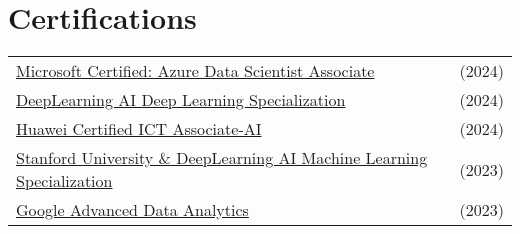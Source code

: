 \documentclass[a4paper,10pt]{article}
\begin{document}
\section{Certifications}
\begin{tabularx}{\linewidth}{@{}l X@{}}	
\href{https://balcortex.github.io/assets/certifications/microsoft_azure_data_scientist_associate.pdf}{Microsoft Certified: Azure Data Scientist Associate} & \hfill (2024) \\
\href{https://balcortex.github.io/assets/certifications/coursera_deep_learning.pdf}{DeepLearning AI Deep Learning Specialization} & \hfill (2024) \\
\href{https://balcortex.github.io/assets/certifications/huawei_certification.pdf}{Huawei Certified ICT Associate-AI} & \hfill (2024) \\
\href{https://balcortex.github.io/assets/certifications/coursera_machine_learning.pdf}{Stanford University \& DeepLearning AI Machine Learning Specialization} & \hfill (2023) \\
\href{https://balcortex.github.io/assets/certifications/coursera_google_advanced_data_analytics.pdf}{Google Advanced Data Analytics} & \hfill (2023) \\
\end{tabularx}

\end{document}
